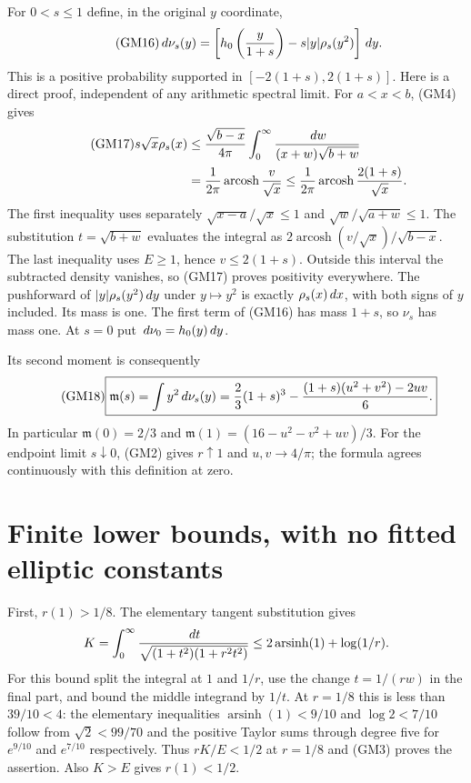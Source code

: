 \documentclass[11pt]{article}
\begin{document}
For $0<s\le1$ define, in the original $y$ coordinate,
\begin{equation}\tag{GM16}
 \,d\nu_s(y)=\left[h_0\left(\frac y{1+s}\right)
                    -s|y|\rho_s(y^2)\right]\,d y.
\end{equation}
This is a positive probability supported in $[-2(1+s),2(1+s)]$.
Here is a direct proof, independent of any arithmetic spectral limit.
For $a<x<b$, (GM4) gives
\begin{align}\tag{GM17}
 s\sqrt x\rho_s(x)
 &\le\frac{\sqrt{b-x}}{4\pi}
          \int_0^\infty\frac{\,d w}{(x+w)\sqrt{b+w}}\notag\\
 &=\frac1{2\pi}\operatorname{arcosh}\frac v{\sqrt x}
 \le\frac1{2\pi}\operatorname{arcosh}\frac{2(1+s)}{\sqrt x}.\notag
\end{align}
The first inequality uses separately $\sqrt{x-a}/\sqrt x\le1$ and
$\sqrt w/\sqrt{a+w}\le1$. The substitution $t=\sqrt{b+w}$ evaluates
the integral as
$2\operatorname{arcosh}(v/\sqrt x)/\sqrt{b-x}$.
The last inequality uses $E\ge1$, hence $v\le2(1+s)$.
Outside this interval the subtracted density vanishes, so (GM17)
proves positivity everywhere. The pushforward of
$|y|\rho_s(y^2)\,d y$ under $y\mapsto y^2$ is exactly
$\rho_s(x)\,d x$, with both signs of $y$ included. Its mass is one.
The first term of (GM16) has mass $1+s$, so $\nu_s$ has mass one.
At $s=0$ put $\,d\nu_0=h_0(y)\,d y$.

Its second moment is consequently
\begin{equation}\tag{GM18}
 \boxed{\mathfrak m(s)=\int y^2\,d\nu_s(y)
 =\frac23(1+s)^3-\frac{(1+s)(u^2+v^2)-2uv}{6}.}
\end{equation}
In particular $\mathfrak m(0)=2/3$ and
$\mathfrak m(1)=(16-u^2-v^2+uv)/3$.
For the endpoint limit $s\downarrow0$, (GM2) gives
$r\uparrow1$ and $u,v\to4/\pi$; the formula agrees continuously
with this definition at zero.

\section{Finite lower bounds, with no fitted elliptic constants}
First, $r(1)>1/8$. The elementary tangent substitution gives
\[
 K=\int_0^\infty\frac{\,d t}{\sqrt{(1+t^2)(1+r^2t^2)}}
 \le2\operatorname{arsinh}(1)+\log(1/r).
\]
For this bound split the integral at $1$ and $1/r$, use the change
$t=1/(rw)$ in the final part, and bound the middle integrand by $1/t$.
At $r=1/8$ this is less than $39/10<4$: the elementary inequalities
$\operatorname{arsinh}(1)<9/10$ and $\log2<7/10$ follow from
$\sqrt2<99/70$ and the positive Taylor sums through degree five for
$e^{9/10}$ and $e^{7/10}$ respectively.
Thus $rK/E<1/2$ at $r=1/8$ and (GM3) proves the assertion.
Also $K>E$ gives $r(1)<1/2$.
\end{document}
